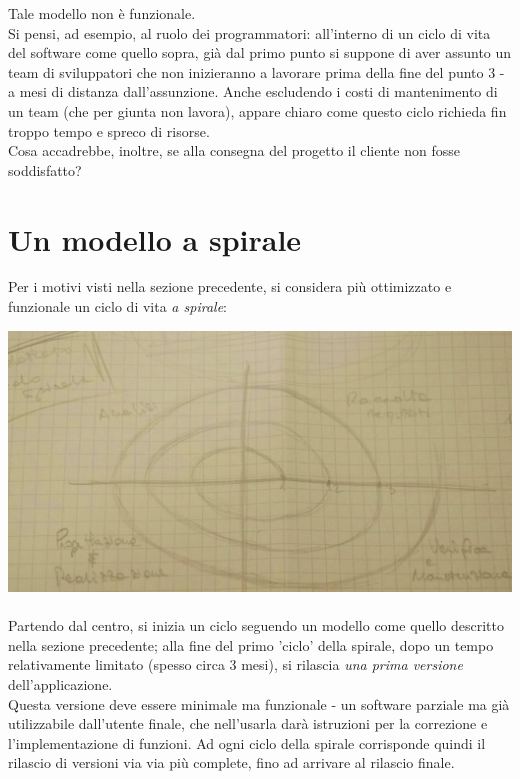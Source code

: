 Tale modello non è funzionale.\\
Si pensi, ad esempio, al ruolo dei programmatori: all'interno di un ciclo di vita del software come quello sopra, già dal primo punto si suppone di aver assunto un team di sviluppatori che non inizieranno a lavorare prima della fine del punto 3 - a mesi di distanza dall'assunzione. Anche escludendo i costi di mantenimento di un team (che per giunta non lavora), appare chiaro come questo ciclo richieda fin troppo tempo e spreco di risorse.\\
Cosa accadrebbe, inoltre, se alla consegna del progetto il cliente non fosse soddisfatto?

\section{Un modello a spirale}
Per i motivi visti nella sezione precedente, si considera più ottimizzato e funzionale un ciclo di vita \textit{a spirale}:

\includegraphics[width=\textwidth]{spiral.jpg} \hfill \\ \\
Partendo dal centro, si inizia un ciclo seguendo un modello come quello descritto nella sezione precedente; alla fine del primo 'ciclo' della spirale, dopo un tempo relativamente limitato (spesso circa 3 mesi), si rilascia \textit{una prima \textit{}versione} dell'applicazione.\\
Questa versione deve essere minimale ma funzionale - un software parziale ma già utilizzabile dall'utente finale, che nell'usarla darà istruzioni per la correzione e l'implementazione di funzioni. Ad ogni ciclo della spirale corrisponde quindi il rilascio di versioni via via più complete, fino ad arrivare al rilascio finale.

